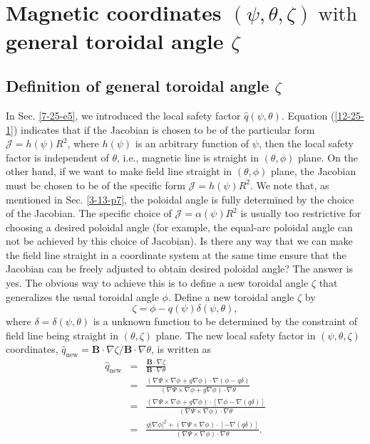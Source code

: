 \documentclass{article}
\newcommand{\tmop}[1]{\ensuremath{\operatorname{#1}}}
\begin{document}
\

\

\section{Magnetic coordinates $(\psi, \theta, \zeta) \tmop{with}$general
toroidal angle $\zeta$}

\subsection{\label{6-25-3}Definition of general toroidal angle $\zeta$}

In Sec. \ref{7-25-e5}, we introduced the local safety factor $\hat{q} (\psi,
\theta)$. Equation (\ref{12-25-1}) indicates that if the Jacobian is chosen to
be of the particular form $\mathcal{J}= h (\psi) R^2$, where $h (\psi)$ is an
arbitrary function of $\psi$, then the local safety factor is independent of
$\theta$, i.e., magnetic line is straight in $(\theta, \phi)$ plane. On the
other hand, if we want to make field line straight in $(\theta, \phi)$ plane,
the Jacobian must be chosen to be of the specific form $\mathcal{J}= h (\psi)
R^2$. We note that, as mentioned in Sec. \ref{3-13-p7}, the poloidal angle is
fully determined by the choice of the Jacobian. The specific choice of
$\mathcal{J}= \alpha (\psi) R^2$ is usually too restrictive for choosing a
desired poloidal angle (for example, the equal-arc poloidal angle can not be
achieved by this choice of Jacobian). Is there any way that we can make the
field line straight in a coordinate system at the same time ensure that the
Jacobian can be freely adjusted to obtain desired poloidal angle? The answer
is yes. The obvious way to achieve this is to define a new toroidal angle
$\zeta$ that generalizes the usual toroidal angle $\phi$. Define a new
toroidal angle $\zeta$ by{\cite{cheng1987}}
\begin{equation}
  \label{5-13-e10} \zeta = \phi - q (\psi) \delta (\psi, \theta),
\end{equation}
where $\delta = \delta (\psi, \theta)$ is a unknown function to be determined
by the constraint of field line being straight in $(\theta, \zeta)$ plane. The
new local safety factor in $(\psi, \theta, \zeta)$ coordinates,
$\hat{q}_{\tmop{new}} =\mathbf{B} \cdot \nabla \zeta /\mathbf{B} \cdot \nabla
\theta$, is written as
\begin{eqnarray}
  \hat{q}_{\tmop{new}} & = & \frac{\mathbf{B} \cdot \nabla \zeta}{\mathbf{B}
  \cdot \nabla \theta} \nonumber\\
  & = & \frac{(\nabla \Psi \times \nabla \phi + g \nabla \phi) \cdot \nabla
  (\phi - q \delta)}{(\nabla \Psi \times \nabla \phi + g \nabla \phi) \cdot
  \nabla \theta} \nonumber\\
  & = & \frac{(\nabla \Psi \times \nabla \phi + g \nabla \phi) \cdot [\nabla
  \phi - \nabla (q \delta)]}{(\nabla \Psi \times \nabla \phi) \cdot \nabla
  \theta} \nonumber\\
  & = & \frac{g | \nabla \phi |^2 + (\nabla \Psi \times \nabla \phi) \cdot [-
  \nabla (q \delta)]}{(\nabla \Psi \times \nabla \phi) \cdot \nabla \theta} . 
\end{eqnarray}
\end{document}
